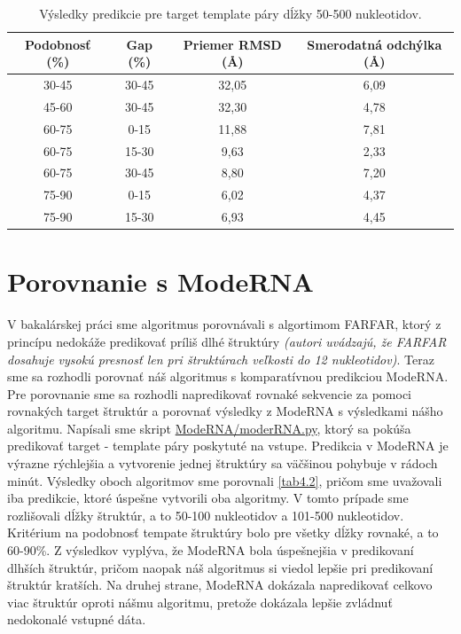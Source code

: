 \begin{table}[b!]
\centering
\begin{tabular}{cccc}
\toprule
Podobnosť (\%) & Gap (\%)  & Priemer RMSD (Å) & Smerodatná odchýlka  (Å)\\
\midrule
30-45  & 30-45 & 32,05 & 6,09 \\
45-60  & 30-45 & 32,30 & 4,78 \\
60-75  &   0-15 & 11,88 & 7,81 \\
60-75  & 15-30 &   9,63 & 2,33 \\
60-75  & 30-45 &   8,80 & 7,20 \\
75-90  &   0-15 &   6,02 & 4,37 \\
75-90  & 15-30 &   6,93 & 4,45 \\
\bottomrule
\end{tabular}
\caption{Výsledky predikcie pre target template páry dĺžky 50-500 nukleotidov. }\label{tab4.1}
\end{table}


\section{Porovnanie s ModeRNA}
V bakalárskej práci sme algoritmus porovnávali s algortimom FARFAR, ktorý z princípu nedokáže predikovať príliš dlhé štruktúry \textit{(autori uvádzajú, že FARFAR dosahuje vysokú presnosť len pri štruktúrach veľkosti do 12 nukleotidov)}. Teraz sme sa rozhodli porovnať náš algoritmus s komparatívnou predikciou ModeRNA. Pre porovnanie sme sa rozhodli napredikovať rovnaké sekvencie za pomoci rovnakých target štruktúr a porovnať výsledky z ModeRNA s výsledkami nášho algoritmu. Napísali sme skript \url{ModeRNA/moderRNA.py}, ktorý sa pokúša predikovať target - template páry poskytuté na vstupe. Predikcia v ModeRNA je výrazne rýchlejšia a vytvorenie jednej štruktúry sa väčšinou pohybuje v rádoch minút. Výsledky oboch algoritmov sme porovnali \autoref{tab4.2}, pričom sme uvažovali iba predikcie, ktoré úspešne vytvorili oba algoritmy. V tomto prípade sme rozlišovali dĺžky štruktúr, a to 50-100 nukleotidov a 101-500 nukleotidov. Kritérium na podobnosť tempate štruktúry bolo pre všetky dĺžky rovnaké, a to 60-90\%. Z výsledkov vyplýva, že ModeRNA bola úspešnejšia v predikovaní dlhších štruktúr, pričom naopak náš algoritmus si viedol lepšie pri predikovaní štruktúr kratších. Na druhej strane, ModeRNA dokázala napredikovať celkovo viac štruktúr oproti nášmu algoritmu, pretože dokázala lepšie zvládnuť nedokonalé vstupné dáta.


